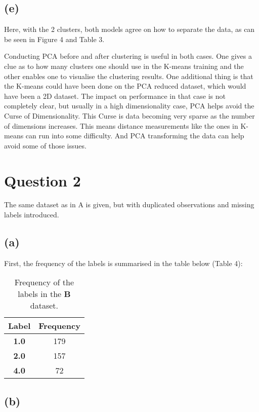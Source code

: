 \documentclass[12pt]{report} %
\begin{document}
\subsection*{(e)}

Here, with the 2 clusters, both models agree on how to separate the data, as can be seen in Figure 4 and Table 3. 

Conducting PCA before and after clustering is useful in both cases. One gives a clue as to how many clusters one should use in the K-means training and the other enables one to visualise the clustering results. One additional thing is that the K-means could have been done on the PCA reduced dataset, which would have been a 2D dataset. The impact on performance in that case is not completely clear, but usually in a high dimensionality case, PCA helps avoid the Curse of Dimensionality. This Curse is data becoming very sparse as the number of dimensions increases\cite[p. 217]{sklearn_book}. This means distance measurements like the ones in K-means can run into some difficulty. And PCA transforming the data can help avoid some of those issues.

\newpage

\section*{Question 2}

The same dataset as in A is given, but with duplicated observations and missing labels introduced.

\subsection*{(a)}

First, the frequency of the labels is summarised in the table below (Table 4):

\begin{table}[h]
\centering
\begin{tabular}{ |c|c| }
    \hline
    \textbf{Label} & \textbf{Frequency} \\
    \hline
    \textbf{1.0} & 179 \\ 
    \hline
    \textbf{2.0} & 157 \\
    \hline
    \textbf{4.0} & 72 \\
    \hline
\end{tabular}
\caption{Frequency of the labels in the \textbf{B} dataset.}
\end{table}

\subsection*{(b)}
\end{document}

